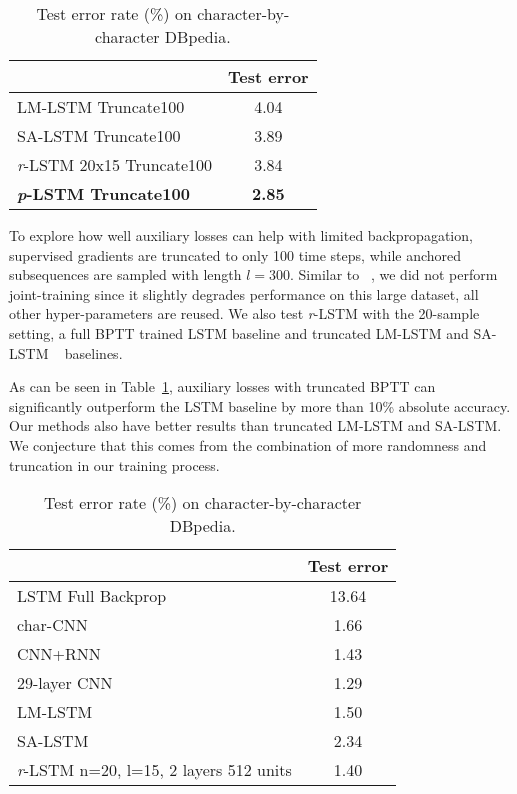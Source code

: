 \documentclass{article}
\newcommand{\rlstm}{{\it r}-LSTM}
\newcommand{\plstm}{{\it p}-LSTM}
\begin{document}
\begin{table}[htb]
\caption{Test error rate (\%) on character-by-character DBpedia.}
\label{tab:dbpedia_truncate}
\vskip 0.15in
\begin{center}
\begin{small}

\begin{tabular}{lc}
\toprule
 & Test error \\ 
\midrule
LM-LSTM Truncate100 & 4.04 \\
SA-LSTM Truncate100 & 3.89 \\
\midrule
\rlstm{} 20x15 Truncate100 & 3.84 \\ %
\textbf{\plstm{} Truncate100} & \textbf{2.85} \\
\bottomrule
\end{tabular}
\end{small}
\end{center}
\vskip -0.1in
\end{table}


To explore how well auxiliary losses can help with limited backpropagation, supervised gradients are truncated to only 100 time steps, while anchored subsequences are sampled with length $l=300$. Similar to ~\citet{dai2015semi}, we did not perform joint-training since it slightly degrades performance on this large dataset, all other hyper-parameters are reused. We also test \rlstm{} with the 20-sample setting, a full BPTT trained LSTM baseline and truncated LM-LSTM and SA-LSTM ~\cite{dai2015semi} baselines.


As can be seen in Table~\ref{tab:dbpedia_truncate}, auxiliary losses with truncated BPTT can significantly outperform the LSTM baseline by more than 10\% absolute accuracy. Our methods also have better results than truncated LM-LSTM and SA-LSTM. We conjecture that this comes from the combination of more randomness and truncation in our training process.

\begin{table}[htb]
\caption{Test error rate (\%) on character-by-character DBpedia.}
\label{tab:dbpedia}
\vskip 0.15in
\begin{center}
\begin{small}
\begin{tabular}{lc}
\toprule
 & Test error \\ 
\midrule
LSTM Full Backprop~\cite{dai2015semi}    & 13.64 \\ 
char-CNN~\cite{zhang2015text} & 1.66 \\
CNN+RNN~\cite{xiaocrnn16} & 1.43 \\
29-layer CNN~\cite{ConneauVDCNN16} & 1.29 \\
LM-LSTM~\cite{dai2015semi} & 1.50 \\
SA-LSTM~\cite{dai2015semi} & 2.34 \\
\midrule
\rlstm{} n=20, l=15, 2 layers 512 units & 1.40 \\
\bottomrule
\end{tabular}
\end{small}
\end{center}
\vskip -0.1in
\end{table}
\end{document}
